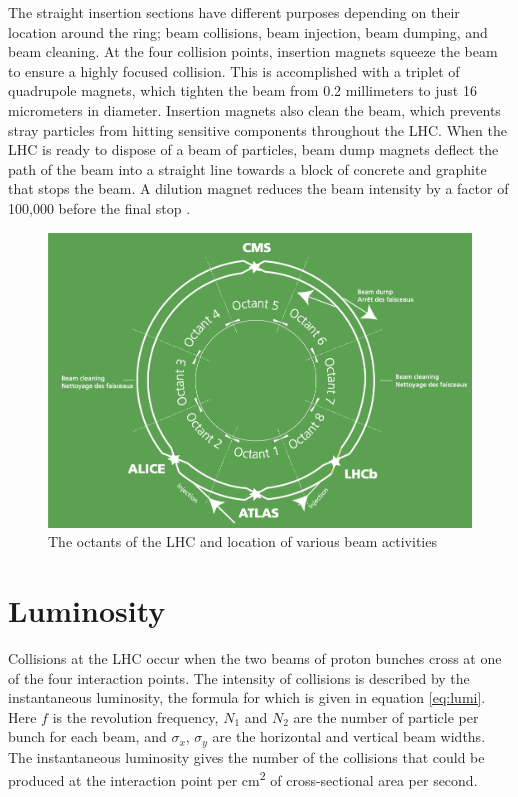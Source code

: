 The straight insertion sections have different purposes depending on their location around the ring; beam collisions, beam injection, beam dumping, and beam cleaning. At the four collision points, insertion magnets squeeze the beam to ensure a highly focused collision. This is accomplished with a triplet of quadrupole magnets, which tighten the beam from 0.2 millimeters to just 16 micrometers in diameter. Insertion magnets also clean the beam, which prevents stray particles from hitting sensitive components throughout the LHC. When the LHC is ready to dispose of a beam of particles, beam dump magnets deflect the path of the beam into a straight line towards a block of concrete and graphite that stops the beam. A dilution magnet reduces the beam intensity by a factor of 100,000 before the final stop \cite{lhc_magnets}. 
\begin{figure}
        \centering
	\includegraphics[width=.7\textwidth]{figures/ch2/lhc_octants.png}
	\caption{The octants of the LHC and location of various beam activities \cite{lhc_faq}}
	\label{fig:lhc_octants}
\end{figure} 
 
 \section{Luminosity}
 
Collisions at the LHC occur when the two beams of proton bunches cross at one of the four interaction points. The intensity of collisions is described by the instantaneous luminosity, the formula for which is given in equation \ref{eq:lumi}. Here $f$ is the revolution frequency, $N_1$ and $N_2$ are the number of particle per bunch for each beam, and $\sigma_x$, $\sigma_y$ are the horizontal and vertical beam widths. The instantaneous luminosity gives the number of the collisions that could be produced at the interaction point per cm\textsuperscript{2} of cross-sectional area per second. 
 
